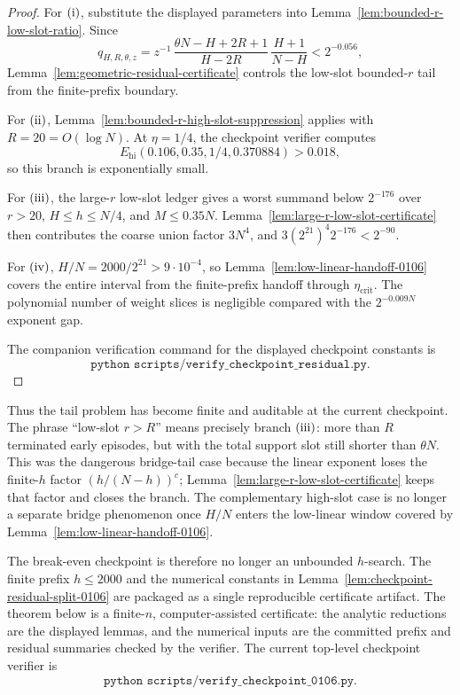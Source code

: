 \begin{proof}
For \({\rm (i)}\), substitute the displayed parameters into Lemma~\ref{lem:bounded-r-low-slot-ratio}.  Since
\[
q_{H,R,\theta,z}
=
z^{-1}\,
\frac{\theta N-H+2R+1}{H-2R}\,
\frac{H+1}{N-H}
<2^{-0.056},
\]
Lemma~\ref{lem:geometric-residual-certificate} controls the low-slot bounded-\(r\) tail from the finite-prefix
boundary.

For \({\rm (ii)}\), Lemma~\ref{lem:bounded-r-high-slot-suppression} applies with \(R=20=O(\log N)\).  At
\(\eta=1/4\), the checkpoint verifier computes
\[
E_{\mathrm{hi}}(0.106,0.35,1/4,0.370884)>0.018,
\]
so this branch is exponentially small.

For \({\rm (iii)}\), the large-\(r\) low-slot ledger gives a worst summand below \(2^{-176}\) over
\(r>20\), \(H\le h\le N/4\), and \(M\le0.35N\).  Lemma~\ref{lem:large-r-low-slot-certificate} then contributes the
coarse union factor \(3N^4\), and \(3(2^{21})^4 2^{-176}<2^{-90}\).

For \({\rm (iv)}\), \(H/N=2000/2^{21}>9\cdot10^{-4}\), so Lemma~\ref{lem:low-linear-handoff-0106} covers the entire
interval from the finite-prefix handoff through \(\eta_{\mathrm{crit}}\).  The polynomial number of weight slices is
negligible compared with the \(2^{-0.009N}\) exponent gap.

The companion verification command for the displayed checkpoint constants is
\[
\texttt{python scripts/verify\_checkpoint\_residual.py}.
\]
\end{proof}

Thus the tail problem has become finite and auditable at the current checkpoint.  The phrase ``low-slot \(r>R\)''
means precisely branch \({\rm (iii)}\): more than \(R\) terminated early episodes, but with the total support slot
still shorter than \(\theta N\).  This was the dangerous bridge-tail case because the linear exponent loses the
finite-\(h\) factor \((h/(N-h))^c\); Lemma~\ref{lem:large-r-low-slot-certificate} keeps that factor and closes the
branch.  The complementary high-slot case is no longer a separate bridge phenomenon once \(H/N\) enters the
low-linear window covered by Lemma~\ref{lem:low-linear-handoff-0106}.

The break-even checkpoint is therefore no longer an unbounded \(h\)-search.  The finite prefix \(h\le2000\) and the
numerical constants in Lemma~\ref{lem:checkpoint-residual-split-0106} are packaged as a single reproducible
certificate artifact.  The theorem below is a finite-\(n\), computer-assisted certificate: the analytic reductions are
the displayed lemmas, and the numerical inputs are the committed prefix and residual summaries checked by the verifier.
The current top-level checkpoint verifier is
\[
\texttt{python scripts/verify\_checkpoint\_0106.py}.
\]

